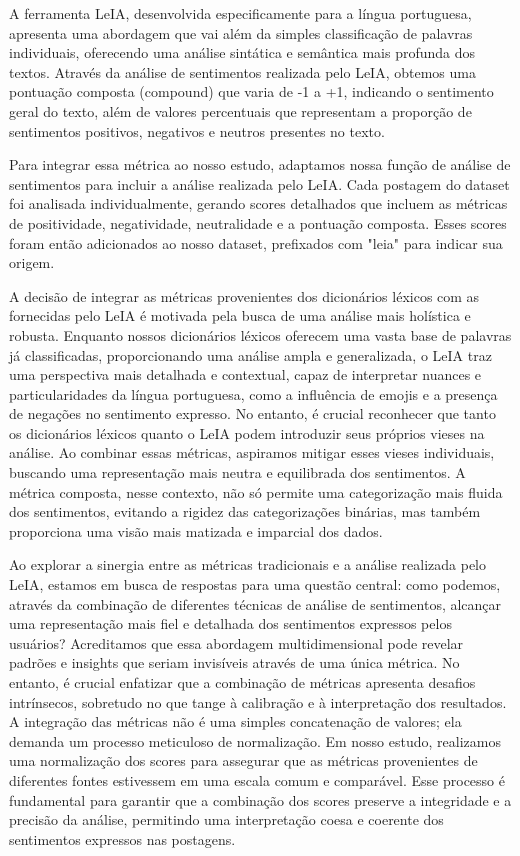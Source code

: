 A ferramenta LeIA, desenvolvida especificamente para a língua portuguesa, apresenta uma abordagem que vai além da simples classificação de palavras individuais, oferecendo uma análise sintática e semântica mais profunda dos textos. Através da análise de sentimentos realizada pelo LeIA, obtemos uma pontuação composta (compound) que varia de -1 a +1, indicando o sentimento geral do texto, além de valores percentuais que representam a proporção de sentimentos positivos, negativos e neutros presentes no texto.

Para integrar essa métrica ao nosso estudo, adaptamos nossa função de análise de sentimentos para incluir a análise realizada pelo LeIA. Cada postagem do dataset foi analisada individualmente, gerando scores detalhados que incluem as métricas de positividade, negatividade, neutralidade e a pontuação composta. Esses scores foram então adicionados ao nosso dataset, prefixados com "leia" para indicar sua origem.

A decisão de integrar as métricas provenientes dos dicionários léxicos com as fornecidas pelo LeIA é motivada pela busca de uma análise mais holística e robusta. Enquanto nossos dicionários léxicos oferecem uma vasta base de palavras já classificadas, proporcionando uma análise ampla e generalizada, o LeIA traz uma perspectiva mais detalhada e contextual, capaz de interpretar nuances e particularidades da língua portuguesa, como a influência de emojis e a presença de negações no sentimento expresso. No entanto, é crucial reconhecer que tanto os dicionários léxicos quanto o LeIA podem introduzir seus próprios vieses na análise. Ao combinar essas métricas, aspiramos mitigar esses vieses individuais, buscando uma representação mais neutra e equilibrada dos sentimentos. A métrica composta, nesse contexto, não só permite uma categorização mais fluida dos sentimentos, evitando a rigidez das categorizações binárias, mas também proporciona uma visão mais matizada e imparcial dos dados.

Ao explorar a sinergia entre as métricas tradicionais e a análise realizada pelo LeIA, estamos em busca de respostas para uma questão central: como podemos, através da combinação de diferentes técnicas de análise de sentimentos, alcançar uma representação mais fiel e detalhada dos sentimentos expressos pelos usuários? Acreditamos que essa abordagem multidimensional pode revelar padrões e insights que seriam invisíveis através de uma única métrica. No entanto, é crucial enfatizar que a combinação de métricas apresenta desafios intrínsecos, sobretudo no que tange à calibração e à interpretação dos resultados. A integração das métricas não é uma simples concatenação de valores; ela demanda um processo meticuloso de normalização. Em nosso estudo, realizamos uma normalização dos scores para assegurar que as métricas provenientes de diferentes fontes estivessem em uma escala comum e comparável. Esse processo é fundamental para garantir que a combinação dos scores preserve a integridade e a precisão da análise, permitindo uma interpretação coesa e coerente dos sentimentos expressos nas postagens.


